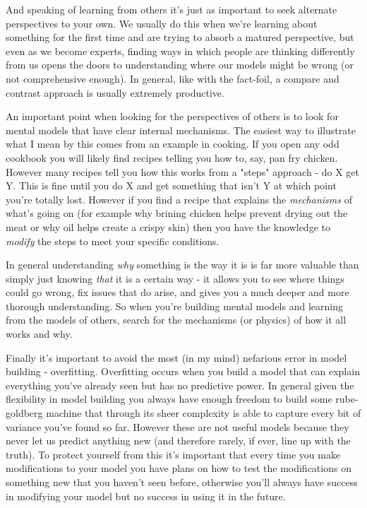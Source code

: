 \documentclass[11pt,a5paper]{book}
\begin{document}
And speaking of learning from others it's just as important to seek alternate perspectives to your own. We usually do this when we're learning about something for the first time and are trying to absorb a matured perspective, but even as we become experts, finding ways in which people are thinking differently from us opens the doors to understanding where our models might be wrong (or not comprehensive enough). In general, like with the fact-foil, a compare and contrast approach is usually extremely productive.
\newline

An important point when looking for the perspectives of others is to look for mental models that have clear internal mechanisms. The easiest way to illustrate what I mean by this comes from an example in cooking. If you open any odd cookbook you will likely find recipes telling you how to, say, pan fry chicken. However many recipes tell you how this works from a "steps" approach - do X get Y. This is fine until you do X and get something that isn't Y at which point you're totally lost. However if you find a recipe that explains the \textit{mechanisms} of what's going on (for example why brining chicken helps prevent drying out the meat or why oil helps create a crispy skin) then you have the knowledge to \textit{modify} the steps to meet your specific conditions. 
\newline

In general understanding \textit{why} something is the way it is is far more valuable than simply just knowing \textit{that} it is a certain way - it allows you to see where things could go wrong, fix issues that do arise, and gives you a much deeper and more thorough understanding. So when you're building mental models and learning from the models of others, search for the mechanisms (or physics) of how it all works and why.
\newline

Finally it's important to avoid the most (in my mind) nefarious error in model building - overfitting. Overfitting occurs when you build a model that can explain everything you've already seen but has no predictive power. In general given the flexibility in model building you always have enough freedom to build some rube-goldberg machine that through its sheer complexity is able to capture every bit of variance you've found so far. However these are not useful models because they never let us predict anything new (and therefore rarely, if ever, line up with the truth). To protect yourself from this it's important that every time you make modifications to your model you have plans on how to test the modifications on something new that you haven't seen before, otherwise you'll always have success in modifying your model but no success in using it in the future. 
\newline
\end{document}
